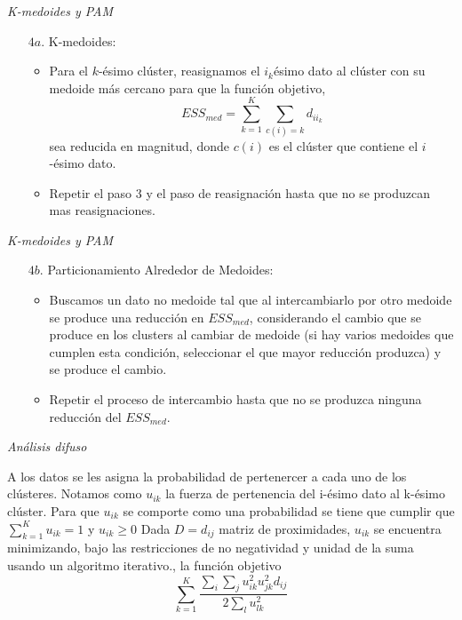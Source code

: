 \documentclass[spanish]{beamer}
\begin{document}
\begin{frame}{\textit{K-medoides y PAM}}
\begin{enumerate}

\item[$4a.$] K-medoides:
\begin{itemize}
\item Para el $k$-ésimo clúster, reasignamos el $i_k$ésimo dato al clúster con su medoide más cercano para que la función objetivo, $$ESS_{med}=\sum_{k=1}^{K}\sum_{c(i)=k}d_{ii_k}$$
sea reducida en magnitud, donde $c(i)$ es el clúster que contiene el $i$-ésimo dato.
\item Repetir el paso 3 y el paso de reasignación hasta que no se produzcan mas reasignaciones.
\end{itemize}

\end{enumerate}

\end{frame}


\begin{frame}{\textit{K-medoides y PAM}}
\begin{enumerate}

\item[$4b.$] Particionamiento Alrededor de Medoides:

\begin{itemize}
\item Buscamos un dato no medoide tal que al intercambiarlo por otro medoide se produce una reducción en $ESS_{med}$, considerando el cambio que se produce en los clusters al cambiar de medoide (si hay varios medoides que cumplen esta condición, seleccionar el que mayor reducción produzca) y se produce el cambio.

\item Repetir el proceso de intercambio hasta que no se produzca ninguna reducción del $ESS_{med}$.
\end{itemize}
\end{enumerate}

\end{frame}

\begin{frame}{\textit{Análisis difuso}}

A los datos se les asigna la probabilidad de pertenercer a cada uno de los clústeres. Notamos como $u_{ik}$ la fuerza de pertenencia del i-ésimo dato al k-ésimo clúster.
\newline
\newline
Para que $u_{ik}$ se comporte como una probabilidad se tiene que cumplir que $\sum_{k=1}^Ku_{ik}=1$ y $u_{ik}\geq0$
\newline
\newline
Dada $D=d_{ij}$ matriz de proximidades, $u_{ik}$ se encuentra minimizando, bajo las restricciones de no negatividad y unidad de la suma usando un algoritmo iterativo., la función objetivo
$$\sum_{k=1}^{K}\frac{\sum_i\sum_ju_{ik}^2u_{jk}^2d_{ij}}{2\sum_lu_{lk}^2}$$



\end{frame}
\end{document}
